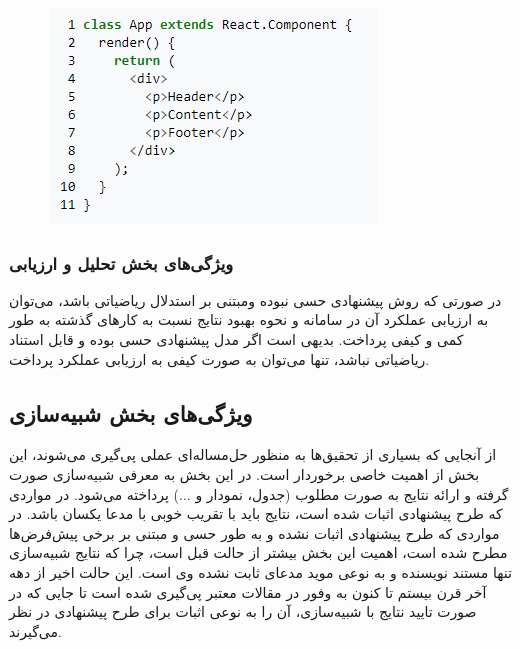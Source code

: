 \documentclass{CSICC2020}
\begin{document}
\begin{figure}[h!]
\centering\includegraphics[width=\linewidth]{Images/react}
\caption{}
\label{fig:React}
\end{figure}



















\subsubsection{ویژگی‌های بخش تحلیل و ارزیابی}
در صورتی که روش پیشنهادی حسی نبوده ومبتنی بر استدلال ریاضیاتی باشد، می‌توان به ارزیابی عملکرد آن در سامانه و نحوه بهبود نتایج نسبت به کارهای گذشته به طور کمی و کیفی پرداخت. بدیهی است اگر مدل پیشنهادی حسی بوده و قابل استناد ریاضیاتی نباشد، تنها می‌توان به صورت کیفی به ارزیابی عملکرد پرداخت.


\subsection{ویژگی‌های بخش شبیه‌سازی}
\label{Sec:ExperimentalResults}

از آنجایی که بسیاری از تحقیق‌ها به منظور حل‌مساله‌ای عملی پی‌گیری می‌شوند، این بخش از اهمیت خاصی برخوردار است. در این بخش به معرفی شبیه‌سازی صورت گرفته و ارائه نتایج به صورت مطلوب (جدول، نمودار و ...) پرداخته می‌شود. در مواردی که طرح پیشنهادی اثبات شده است، نتایج باید با تقریب خوبی با مدعا یکسان باشد. در مواردی که طرح پیشنهادی اثبات نشده و به طور حسی و مبتنی بر برخی پیش‌فرض‌ها مطرح شده است،  اهمیت این بخش بیشتر از حالت قبل است، چرا که نتایج شبیه‌سازی تنها مستند نویسنده و به نوعی موید مدعای ثابت نشده وی است. این حالت اخیر از دهه آخر قرن بیستم تا کنون به وفور در مقالات معتبر پی‌گیری شده است تا جایی که در صورت تایید نتایج با شبیه‌سازی، آن را به نوعی اثبات برای طرح پیشنهادی در نظر می‌گیرند.
\end{document}
